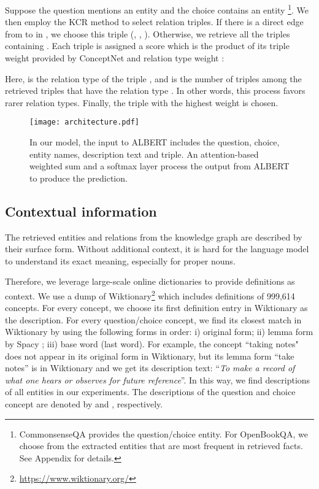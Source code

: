 \documentclass[11pt,a4paper]{article}
\begin{document}
Suppose the question mentions an entity  and the choice contains an entity \footnote{CommonsenseQA provides the question/choice entity. For OpenBookQA, we choose from the extracted entities that are most frequent in retrieved facts. See Appendix for details.}.
We then employ the KCR method \citep{KCR} to select relation triples. If there is a direct edge  from  to  in , we choose this triple (, , ). Otherwise, we retrieve all the  triples containing . Each triple  is assigned a score  which is the product of its triple weight  provided by ConceptNet and relation type weight :



Here,  is the relation type of the triple , and  is the number of triples among the retrieved triples that have the relation type . In other words, this process favors rarer relation types. Finally, the triple with the highest weight is chosen. 

\begin{figure*}[t]
    \centering
\texttt{[image: architecture.pdf]}
\caption{In our model, the input to ALBERT includes the question, choice, entity names, description text and triple. An attention-based weighted sum and a softmax layer process the output from ALBERT to produce the prediction.}
\label{fig:archi}
\end{figure*}

\subsection{Contextual information}
\label{sec:context}
The retrieved entities and relations from the knowledge graph are described by their surface form. Without additional context, it is hard for the language model to understand its exact meaning, especially for proper nouns.

Therefore, we leverage large-scale online dictionaries to provide definitions as context. We use a dump of Wiktionary\footnote{\url{https://www.wiktionary.org/}} which includes definitions of 999,614 concepts. For every concept, we choose its first definition entry in Wiktionary as the description. For every question/choice concept, we find its closest match in Wiktionary by using the following forms in order: i) original form; ii) lemma form by Spacy \citep{spacy}; iii) base word (last word).
For example, the concept ``taking notes" does not appear in its original form in Wiktionary, but its lemma form ``take notes'' is in Wiktionary and we get its description text: ``\textit{To make a record of what one hears or observes for future reference}''. In this way, we find descriptions of all entities in our experiments. The descriptions of the question and choice concept are denoted by  and , respectively.
\end{document}
